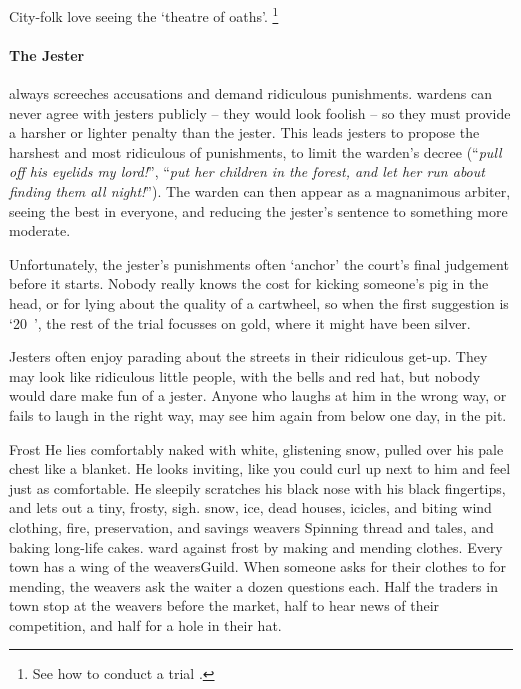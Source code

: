 \begin{multicols}{2}
City-folk love seeing the `theatre of oaths'.%
\footnote{See how to conduct a trial .}

\paragraph[the Jester]{The Jester}
\label{guildJester}%
always screeches accusations and demand ridiculous punishments.
\Glspl{warden} can never agree with jesters publicly -- they would look foolish -- so they must provide a harsher or lighter penalty than the jester.
This leads jesters to propose the harshest and most ridiculous of punishments, to limit the \gls{warden}'s decree (``\emph{pull off his eyelids my lord!}'', ``\emph{put her children in the forest, and let her run about finding them all night!}'').
The \gls{warden} can then appear as a magnanimous arbiter, seeing the best in everyone, and reducing the jester's sentence to something more moderate.

Unfortunately, the jester's punishments often `anchor' the court's final judgement before it starts.
Nobody really knows the cost for kicking someone's pig in the head, or for lying about the quality of a cartwheel, so when the first suggestion is `20~', the rest of the trial focusses on gold, where it might have been silver.

Jesters often enjoy parading about the streets in their ridiculous get-up.
They may look like ridiculous little people, with the bells and red hat, but nobody would dare make fun of a jester.
Anyone who laughs at him in the wrong way, or fails to laugh in the right way, may see him again from below one day, in the pit.

  {Frost}%
  {
    He lies comfortably naked with white, glistening snow, pulled over his pale chest like a blanket.
    He looks inviting, like you could curl up next to him and feel just as comfortable.
    He sleepily scratches his black nose with his black fingertips, and lets out a tiny, frosty, {\sffamily sigh}.
  }%
  {snow, ice, dead houses, icicles, and biting wind}%
  {clothing, fire, preservation, and savings}%
  {\Glspl{weaver}}%
  {
    Spinning thread and tales, and baking long-life cakes.
  }%
ward against frost by making and mending clothes.
Every town has a wing of the \gls{weaversGuild}.
When someone asks for their clothes to for mending, the weavers ask the waiter a dozen questions each.
Half the traders in town stop at the weavers before the market, half to hear news of their competition, and half for a hole in their hat.


\end{multicols}
